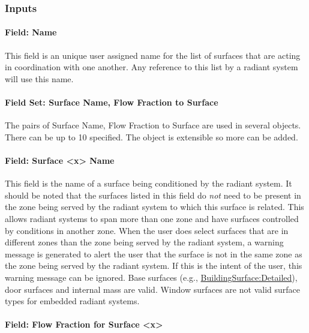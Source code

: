 \subsubsection{Inputs}\label{inputs-8-017}

\paragraph{Field: Name}\label{field-name-8-015}

This field is an unique user assigned name for the list of surfaces that are acting in coordination with one another. Any reference to this list by a radiant system will use this name.

\paragraph{Field Set: Surface Name, Flow Fraction to Surface}\label{field-set-surface-name-flow-fraction-to-surface}

The pairs of Surface Name, Flow Fraction to Surface are used in several objects. There can be up to 10 specified. The object is extensible so more can be added.

\paragraph{Field: Surface \textless{}x\textgreater{} Name}\label{field-surface-x-name-2}

This field is the name of a surface being conditioned by the radiant system. It should be noted that the surfaces listed in this field do \emph{not} need to be present in the zone being served by the radiant system to which this surface is related. This allows radiant systems to span more than one zone and have surfaces controlled by conditions in another zone. When the user does select surfaces that are in different zones than the zone being served by the radiant system, a warning message is generated to alert the user that the surface is not in the same zone as the zone being served by the radiant system. If this is the intent of the user, this warning message can be ignored. Base surfaces (e.g., \hyperref[buildingsurfacedetailed]{BuildingSurface:Detailed}), door surfaces and internal mass are valid. Window surfaces are not valid surface types for embedded radiant systems.

\paragraph{Field: Flow Fraction for Surface \textless{}x\textgreater{}}\label{field-flow-fraction-for-surface-x}

